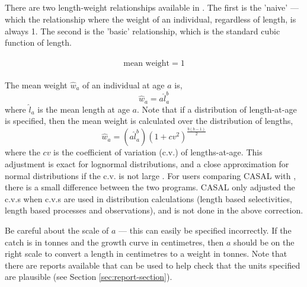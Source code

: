 \subsection{\label{sec:mean-weight}}

There are two length-weight relationships available in \CNAME. The first is the 'naive' --- which the relationship where the weight of an individual, regardless of length, is always 1. The second is the 'basic' relationship, which is the standard cubic function of length. 

\paragraph[None]{}

  \begin{equation}
    \text{mean weight}=1
  \end{equation}

\paragraph[Basic]{}

The mean weight $\hat{w}_a$ of an individual at age $a$ is,
  \begin{equation}
    \hat{w}_a=a \hat{l}_a^b
  \end{equation}
	where $\hat{l}_a$ is the mean length at age $a$. Note that if a distribution of length-at-age is specified, then the mean weight is calculated over the distribution of lengths,
  \begin{equation}
	  \hat{w}_a=(a\hat{l}_a^b)(1+cv^2)^{\frac{b(b-1)}{2}}
  \end{equation}
	where the $cv$ is the coefficient of variation (c.v.) of lengths-at-age. This adjustment is exact for lognormal distributions, and a close approximation for normal distributions if the c.v. is not large \citep{1388}. For users comparing CASAL with \CNAME, there is a small difference between the two programs. CASAL only adjusted the c.v.s  when c.v.s are used in distribution calculations (length based selectivities, length based processes and observations), and is not done in the above correction.


Be careful about the scale of $a$ --- this can easily be specified incorrectly. If the catch is in tonnes and the growth curve in centimetres, then $a$ should be on the right scale to convert a length in centimetres to a weight in tonnes. Note that there are reports available that can be used to help check that the units specified are plausible (see Section \ref{sec:report-section}).

